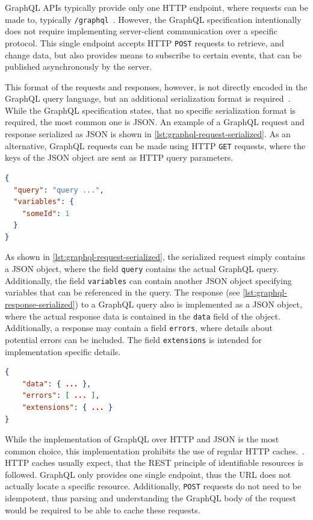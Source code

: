 GraphQL \acp{API} typically provide only one \ac{HTTP} endpoint, where requests can be made to, typically \texttt{/graphql}~\cite{Schmidt2019,Facebook2018}.
However, the GraphQL specification intentionally does not require implementing server-client communication over a specific protocol.
This single endpoint accepts \ac{HTTP} \texttt{POST} requests to retrieve, and change data, but also provides means to subscribe to certain events, that can be published asynchronously by the server.

This format of the requests and responses, however, is not directly encoded in the GraphQL query language, but an additional serialization format is required~\cite{Facebook2018}.
While the GraphQL specification states, that no specific serialization format is required, the most common one is \ac{JSON}.
An example of a GraphQL request and response serialized as \ac{JSON} is shown in \autoref{lst:graphql-request-serialized}.
As an alternative, GraphQL requests can be made using \ac{HTTP} \texttt{GET} requests, where the keys of the \ac{JSON} object are sent as \ac{HTTP} query parameters.

\begin{lstlisting}[language=json,caption={GraphQL Request Serialized as \ac{JSON}}, label={lst:graphql-request-serialized}]
{
  "query": "query ...",
  "variables": { 
    "someId": 1 
  }
}
\end{lstlisting}


As shown in \autoref{lst:graphql-request-serialized}, the serialized request simply contains a \ac{JSON} object, where the field \texttt{query} contains the actual GraphQL query.
Additionally, the field \texttt{variables} can contain another \ac{JSON} object specifying variables that can be referenced in the query.
The response (see \autoref{lst:graphql-response-serialized}) to a GraphQL query also is implemented as a \ac{JSON} object, where the actual response data is contained in the \texttt{data} field of the object.
Additionally, a response may contain a field \texttt{errors}, where details about potential errors can be included.
The field \texttt{extensions} is intended for implementation specific details.

\begin{lstlisting}[language=json,caption={GraphQL Response Serialized as \ac{JSON}}, label={lst:graphql-response-serialized}]
{ 
    "data": { ... },
    "errors": [ ... ],
    "extensions": { ... }
}
\end{lstlisting}

While the implementation of GraphQL over \ac{HTTP} and \ac{JSON} is the most common choice, this implementation prohibits the use of regular \ac{HTTP} caches.~\cite{GQLHTTP, RFC2068}.
\ac{HTTP} caches usually expect, that the \ac{REST} principle of identifiable resources is followed.
GraphQL only provides one single endpoint, thus the \ac{URL} does not actually locate a specific resource.
Additionally, \texttt{POST} requests do not need to be idempotent, thus parsing and understanding the GraphQL body of the request would be required to be able to cache these requests.


